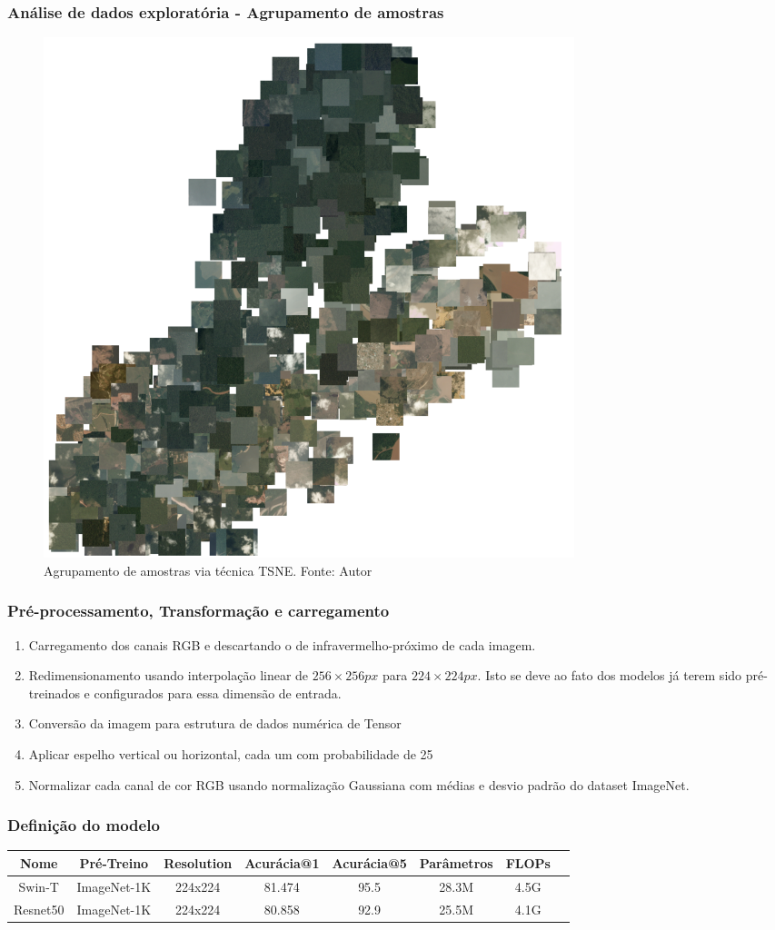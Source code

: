 \documentclass{beamer}
\begin{document}
\begin{frame}
    \frametitle{Análise de dados exploratória - Agrupamento de amostras}
    \begin{figure}[!ht]
        \centering
        \includegraphics[width=0.7\columnwidth]{Imagens/results/EDA/TSNE.png}
        \caption{Agrupamento de amostras via técnica TSNE.
        Fonte: Autor}
       \label{fig:TSNE}
    \end{figure}    
\end{frame}

\begin{frame}
    \frametitle{Pré-processamento, Transformação e carregamento}
    \begin{enumerate}
        \item   Carregamento dos canais RGB e descartando o de infravermelho-próximo de cada imagem.
        \item   Redimensionamento usando interpolação linear de $256 \times 256px$ para $224 \times 224px$. Isto se deve ao fato dos modelos já terem sido pré-treinados e configurados para essa dimensão de entrada.
        \item   Conversão da imagem para estrutura de dados numérica de Tensor
        \item   Aplicar espelho vertical ou horizontal, cada um com probabilidade de 25%
        \item   Normalizar cada canal de cor RGB usando normalização Gaussiana com médias e desvio padrão do dataset ImageNet.
    \end{enumerate}    
\end{frame}

\begin{frame}
\frametitle{Definição do modelo}
\fontsize{7pt}{8pt}\selectfont
\begin{tabular}{*{8}{c}}
    \hline
    Nome & Pré-Treino & Resolution & Acurácia@1 & Acurácia@5 &  Parâmetros & FLOPs \\
    \hline
    Swin-T & ImageNet-1K & 224x224 & 81.474 & 95.5 &	28.3M &	4.5G \\
    Resnet50 & ImageNet-1K & 224x224 &	80.858 & 92.9 &	25.5M &	4.1G \\
    \hline
\end{tabular}
\end{frame}
\end{document}
